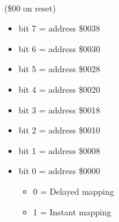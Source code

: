 \\
(\$00 on reset)
\begin{itemize}
\item bit 7 = address \$0038
\item bit 6 = address \$0030
\item bit 5 = address \$0028
\item bit 4 = address \$0020
\item bit 3 = address \$0018
\item bit 2 = address \$0010
\item bit 1 = address \$0008
\item bit 0 = address \$0000
\begin{itemize}
\item[] 0 = Delayed mapping
\item[] 1 = Instant mapping
\end{itemize}
\end{itemize}

